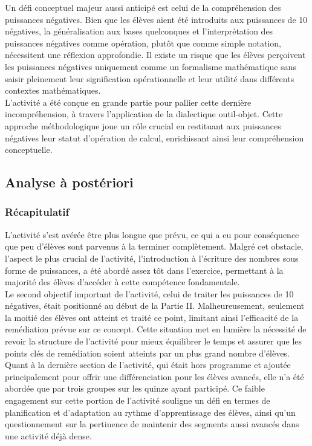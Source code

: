 Un défi conceptuel majeur aussi anticipé est celui de la compréhension des puissances négatives.
Bien que les élèves aient été introduits aux puissances de 10 négatives,
la généralisation aux bases quelconques et l'interprétation des puissances négatives comme opération,
plutôt que comme simple notation,
nécessitent une réflexion approfondie.
Il existe un risque que les élèves perçoivent les puissances négatives uniquement comme un formalisme mathématique sans saisir pleinement leur signification opérationnelle et leur utilité dans différents contextes mathématiques.\\

L'activité a été conçue en grande partie pour pallier cette dernière incompréhension,
à travers l'application de la dialectique outil-objet.
Cette approche méthodologique joue un rôle crucial en restituant aux puissances négatives leur statut d'opération de calcul,
enrichissant ainsi leur compréhension conceptuelle.

\subsection{Analyse à postériori}
\subsubsection{Récapitulatif}
L'activité s'est avérée être plus longue que prévu,
ce qui a eu pour conséquence que peu d'élèves sont parvenus à la terminer complètement.
Malgré cet obstacle,
l'aspect le plus crucial de l'activité,
l'introduction à l'écriture des nombres sous forme de puissances,
a été abordé assez tôt dans l'exercice,
permettant à la majorité des élèves d'accéder à cette compétence fondamentale.\\

Le second objectif important de l'activité,
celui de traiter les puissances de 10 négatives,
était positionné au début de la Partie II.
Malheureusement,
seulement la moitié des élèves ont atteint et traité ce point,
limitant ainsi l'efficacité de la remédiation prévue sur ce concept.
Cette situation met en lumière la nécessité de revoir la structure de l'activité pour mieux équilibrer le temps et assurer que les points clés de remédiation soient atteints par un plus grand nombre d'élèves.\\

Quant à la dernière section de l'activité,
qui était hors programme et ajoutée principalement pour offrir une différenciation pour les élèves avancés,
elle n'a été abordée que par trois groupes sur les quinze ayant participé.
Ce faible engagement sur cette portion de l'activité souligne un défi en termes de planification et d'adaptation au rythme d'apprentissage des élèves,
ainsi qu'un questionnement sur la pertinence de maintenir des segments aussi avancés dans une activité déjà dense.

